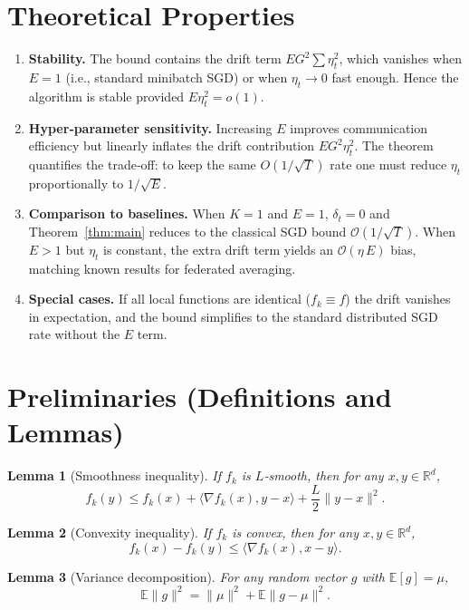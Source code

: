 \documentclass[11pt]{article}
\newtheorem{lemma}{Lemma}
\newcommand{\E}{\mathbb{E}}
\newcommand{\R}{\mathbb{R}}
\begin{document}
\section*{Theoretical Properties}
\begin{enumerate}[label={\bf P\arabic*}:, leftmargin=*]
\item \textbf{Stability.}  
The bound contains the drift term $E G^{2}\sum\eta_t^{2}$, which vanishes when $E=1$ (i.e., standard minibatch SGD) or when $\eta_t\to0$ fast enough. Hence the algorithm is stable provided $E\eta_t^{2}=o(1)$.

\item \textbf{Hyper‑parameter sensitivity.}  
Increasing $E$ improves communication efficiency but linearly inflates the drift contribution $E G^{2}\eta_t^{2}$. The theorem quantifies the trade‑off: to keep the same $O(1/\sqrt{T})$ rate one must reduce $\eta_t$ proportionally to $1/\sqrt{E}$.

\item \textbf{Comparison to baselines.}  
When $K=1$ and $E=1$, $\delta_t=0$ and Theorem~\ref{thm:main} reduces to the classical SGD bound $\mathcal{O}(1/\sqrt{T})$.  
When $E>1$ but $\eta_t$ is constant, the extra drift term yields an $\mathcal{O}(\eta\,E)$ bias, matching known results for federated averaging.

\item \textbf{Special cases.}  
If all local functions are identical ($f_k\equiv f$) the drift vanishes in expectation, and the bound simplifies to the standard distributed SGD rate without the $E$ term.
\end{enumerate}

\section*{Preliminaries (Definitions and Lemmas)}
\begin{lemma}[Smoothness inequality]
\label{lem:smooth}
If $f_k$ is $L$‑smooth, then for any $x,y\in\R^d$,
\[
f_k(y)\le f_k(x)+\langle\nabla f_k(x),y-x\rangle+\frac{L}{2}\|y-x\|^{2}.
\]
\end{lemma}
\begin{lemma}[Convexity inequality]
\label{lem:convex}
If $f_k$ is convex, then for any $x,y\in\R^d$,
\[
f_k(x)-f_k(y)\le\langle\nabla f_k(x),x-y\rangle .
\]
\end{lemma}
\begin{lemma}[Variance decomposition]
\label{lem:var}
For any random vector $g$ with $\E[g]=\mu$,
\[
\E\|g\|^{2}= \|\mu\|^{2}+ \E\|g-\mu\|^{2}.
\]
\end{lemma}
\end{document}
